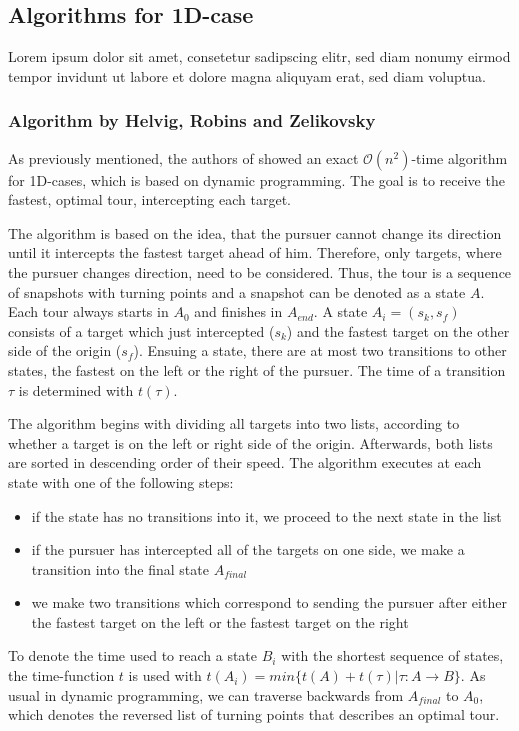 \documentclass{acm_proc_article-sp}
\begin{document}
\subsection{Algorithms for 1D-case}
Lorem ipsum dolor sit amet, consetetur sadipscing elitr, sed diam nonumy eirmod tempor invidunt ut labore et dolore magna aliquyam erat, sed diam voluptua.


\subsubsection{Algorithm by Helvig, Robins and Zelikovsky}
As previously mentioned, the authors of \cite{helvig} showed an exact $\mathcal{O}(n^2)$-time algorithm for 1D-cases, which is based on dynamic programming. The goal is to receive the fastest, optimal tour, intercepting each target. 

The algorithm is based on the idea, that the pursuer cannot change its direction until it intercepts the fastest target ahead of him. Therefore, only targets, where the pursuer changes direction, need to be considered. Thus, the tour is a sequence of snapshots with turning points and a snapshot can be denoted as a state $A$. Each tour always starts in $A_0$ and finishes in $A_{end}$. A state $A_i=(s_k, s_f)$ consists of a target which just intercepted ($s_k$) and the fastest target on the other side of the origin ($s_f$). Ensuing a state, there are at most two transitions to other states, the fastest on the left or the right of the pursuer. The time of a transition $\tau$ is determined with $t(\tau)$. 

The algorithm begins with dividing all targets into two lists, according to whether a target is on the left or right side of the origin. Afterwards, both lists are sorted in descending order of their speed. The algorithm executes at each state with one of the following steps:
\begin{itemize}
\item
if the state has no transitions into it, we proceed to the next state in the list
\item
if the pursuer has intercepted all of the targets on one side, we make a transition into
the final state $A_{final}$
\item
we make two transitions which correspond to sending the pursuer after either the
fastest target on the left or the fastest target on the right

\end{itemize}

To denote the time used to reach a state $B_i$ with the shortest sequence of states, the time-function $t$ is used with $t(A_i)=min\{t(A)+t(\tau)|\tau:A\rightarrow B\}$. As usual in dynamic programming, we can traverse backwards from $A_{final}$ to $A_0$, which denotes the reversed list of turning points that describes an optimal tour.
\end{document}
